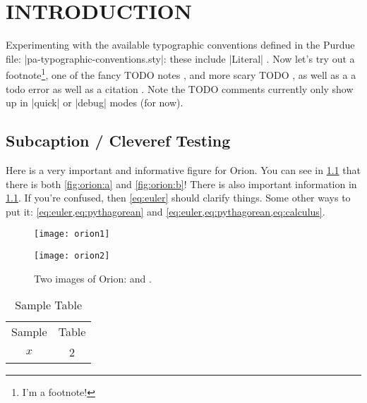 
\chapter{INTRODUCTION}
Experimenting with the available typographic conventions defined in the Purdue file: \NL \Literal|pa-typographic-conventions.sty|:  these include     \Literal|Literal|   . Now let's try out a footnote\footnote{I'm a footnote!}, one of the fancy TODO notes  , and more scary TODO , as well as a a todo error  as well as a citation \cite{Howell:1984_HaloOrbits}. Note the TODO comments currently only show up in \Literal|quick| or \Literal|debug| modes (for now).


\section{Subcaption / Cleveref Testing}
Here is a very important and informative figure for Orion. You can see in \cref{fig:orion} that there is both \cref{fig:orion:a} and \cref{fig:orion:b}! There is also important information in \cref{tab:sample_table}. If you're confused, then \cref{eq:euler} should clarify things. Some other ways to put it: \cref{eq:euler,eq:pythagorean} and \cref{eq:euler,eq:pythagorean,eq:calculus}. 

\begin{figure}[p]
    \centering
    \begin{subcaptionblock}{.49\textwidth}
        \centering
        \texttt{[image: orion1]}
        \caption{Orion 1}
        \label{fig:orion:a}
    \end{subcaptionblock} %
    \begin{subcaptionblock}{.49\textwidth}
        \centering
        \texttt{[image: orion2]}
        \caption{Orion 2}
        \label{fig:orion:b}
    \end{subcaptionblock} %
    \caption{Two images of Orion:  and .}
    \label{fig:orion}
\end{figure}

\begin{table}[p]
    \centering
    \caption{Sample Table}
    \begin{tabular}{|c|c|}
    \hline
        Sample & Table\\
        $x$ & 2\\
    \hline
    \end{tabular}
    \label{tab:sample_table}
\end{table}

